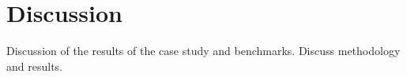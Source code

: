 \section{Discussion}
Discussion of the results of the case study and benchmarks.
Discuss methodology and results.